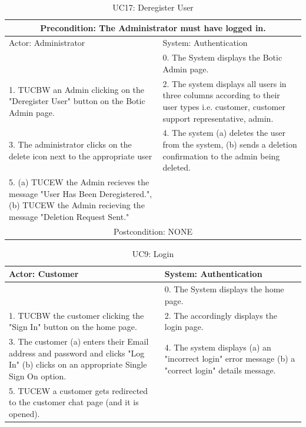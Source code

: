 \documentclass[11pt]{article}
\begin{document}
\begin{table}[H]
	\centering
	\begin{tabular}{|p{8cm}|p{8cm}|}
		\hline
		\multicolumn{2}{|c|}{Precondition: The Administrator must have logged in.} \\
		\hline
		Actor: Administrator & System: Authentication \\
		\hline
		& 0. The System displays the Botic Admin page. \\
		\hline
		1. TUCBW an Admin clicking on the "Deregister User" button on the Botic Admin page. & 2. The system displays all users in three columns according to their user types i.e. customer, customer support representative, admin.\\
		\hline
		3. The administrator clicks on the delete icon next to the appropriate user & 4. The system (a) deletes the user from the system, (b) sends a deletion confirmation to the admin being deleted. \\
		\hline
		5. (a) TUCEW the Admin recieves the message "User Has Been Deregistered.", (b) TUCEW the Admin recieving the message "Deletion Request Sent." & \\
		\hline
		\multicolumn{2}{|c|}{Postcondition: NONE} \\
		\hline
	\end{tabular}
	\caption{UC17: Deregister User}
\end{table}
 
\begin{table}[H]
	\centering
	\begin{tabular}{|p{8cm}|p{8cm}|}
		\hline
		Actor: Customer & System: Authentication \\
		\hline
		 & 0. The System displays the home page.\\
		\hline
		1. TUCBW the customer clicking the "Sign In" button on the home page. & 2. The accordingly displays the login page.\\
		\hline
		3. The customer (a) enters their Email address and password and clicks "Log In" (b) clicks on an appropriate Single Sign On option. & 4. The system displays (a) an "incorrect login" error message (b) a "correct login" details message. \\
		\hline
		5. TUCEW a customer gets redirected to the customer chat page (and it is opened). & \\
		\hline
	\end{tabular}
	\caption{UC9: Login}
\end{table}
\end{document}
